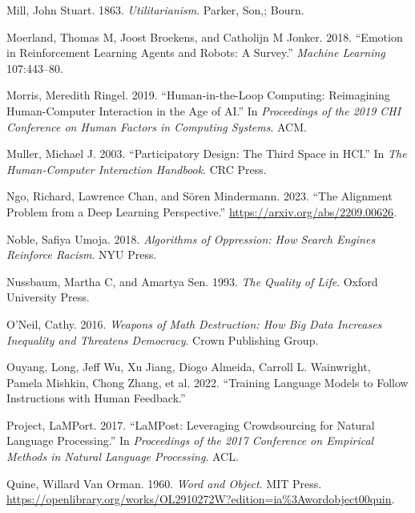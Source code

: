 \documentclass[
  letterpaper,
  DIV=11,
  numbers=noendperiod,
  oneside]{scrreprt}
\newlength{\cslhangindent}
\newenvironment{CSLReferences}[2] %
 {\begin{list}{}{%
  \setlength{\itemindent}{0pt}
  \setlength{\leftmargin}{0pt}
  \setlength{\parsep}{0pt}
  \ifodd #1
   \setlength{\leftmargin}{\cslhangindent}
   \setlength{\itemindent}{-1\cslhangindent}
  \fi
  \setlength{\itemsep}{#2\baselineskip}}}
 {\end{list}}
\theoremstyle{remark}
\begin{document}
\begin{CSLReferences}{1}{0}
Mill, John Stuart. 1863. \emph{Utilitarianism}. Parker, Son,; Bourn.

Moerland, Thomas M, Joost Broekens, and Catholijn M Jonker. 2018.
{``Emotion in Reinforcement Learning Agents and Robots: A Survey.''}
\emph{Machine Learning} 107:443--80.

Morris, Meredith Ringel. 2019. {``Human-in-the-Loop Computing:
Reimagining Human-Computer Interaction in the Age of AI.''} In
\emph{Proceedings of the 2019 CHI Conference on Human Factors in
Computing Systems}. ACM.

Muller, Michael J. 2003. {``Participatory Design: The Third Space in
HCI.''} In \emph{The Human-Computer Interaction Handbook}. CRC Press.

Ngo, Richard, Lawrence Chan, and Sören Mindermann. 2023. {``The
Alignment Problem from a Deep Learning Perspective.''}
\url{https://arxiv.org/abs/2209.00626}.

Noble, Safiya Umoja. 2018. \emph{Algorithms of Oppression: How Search
Engines Reinforce Racism}. NYU Press.

Nussbaum, Martha C, and Amartya Sen. 1993. \emph{The Quality of Life}.
Oxford University Press.

O'Neil, Cathy. 2016. \emph{Weapons of Math Destruction: How Big Data
Increases Inequality and Threatens Democracy}. Crown Publishing Group.

Ouyang, Long, Jeff Wu, Xu Jiang, Diogo Almeida, Carroll L. Wainwright,
Pamela Mishkin, Chong Zhang, et al. 2022. {``Training Language Models to
Follow Instructions with Human Feedback.''}

Project, LaMPort. 2017. {``LaMPost: Leveraging Crowdsourcing for Natural
Language Processing.''} In \emph{Proceedings of the 2017 Conference on
Empirical Methods in Natural Language Processing}. ACL.

Quine, Willard Van Orman. 1960. \emph{Word and Object}. MIT Press.
\url{https://openlibrary.org/works/OL2910272W?edition=ia\%3Awordobject00quin}.


\end{CSLReferences}
\end{document}
